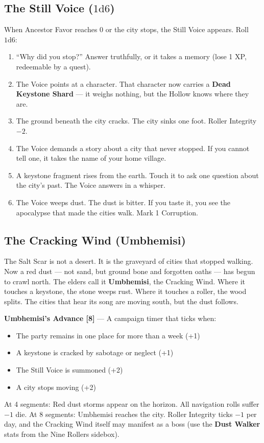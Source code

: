 \subsection*{The Still Voice ($1\text{d}6$)}
When Ancestor Favor reaches 0 or the city stops, the Still Voice appears. Roll $1\text{d}6$:
\begin{enumerate}
\item ``Why did you stop?'' Answer truthfully, or it takes a memory (lose 1 XP, redeemable by a quest).
\item The Voice points at a character. That character now carries a \textbf{Dead Keystone Shard} --- it weighs nothing, but the Hollow knows where they are.
\item The ground beneath the city cracks. The city sinks one foot. Roller Integrity $-2$.
\item The Voice demands a story about a city that never stopped. If you cannot tell one, it takes the name of your home village.
\item A keystone fragment rises from the earth. Touch it to ask one question about the city's past. The Voice answers in a whisper.
\item The Voice weeps dust. The dust is bitter. If you taste it, you see the apocalypse that made the cities walk. Mark 1 Corruption.
\end{enumerate}

\subsection*{The Cracking Wind (Umbhemisi)}
The Salt Scar is not a desert. It is the graveyard of cities that stopped walking. Now a red dust --- not sand, but ground bone and forgotten oaths --- has begun to crawl north. The elders call it \textbf{Umbhemisi}, the Cracking Wind. Where it touches a keystone, the stone weeps rust. Where it touches a roller, the wood splits. The cities that hear its song are moving south, but the dust follows.

\textbf{Umbhemisi's Advance [8]} --- A campaign timer that ticks when:
\begin{itemize}
\item The party remains in one place for more than a week (+1)
\item A keystone is cracked by sabotage or neglect (+1)
\item The Still Voice is summoned (+2)
\item A city stops moving (+2)
\end{itemize}
At 4 segments: Red dust storms appear on the horizon. All navigation rolls suffer $-1$ die.  
At 8 segments: Umbhemisi reaches the city. Roller Integrity ticks $-1$ per day, and the Cracking Wind itself may manifest as a boss (use the \textbf{Dust Walker} stats from the Nine Rollers sidebox).

